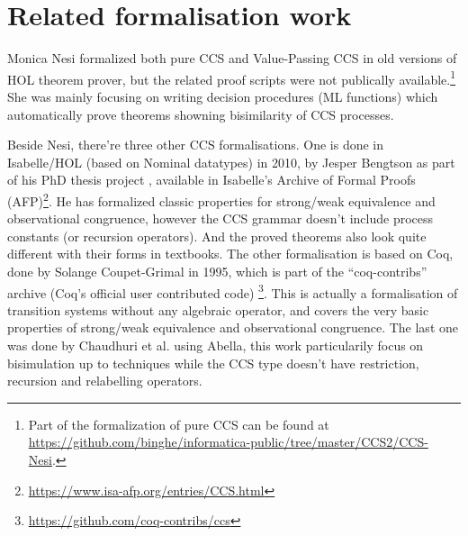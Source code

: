 \section{Related formalisation work}

Monica Nesi formalized both pure CCS \cite{Nesi:1992ve} and Value-Passing CCS
\cite{Nesi:2017wo} in old versions of HOL theorem prover, but the
related proof scripts were not publically available.\footnote{Part of
 the formalization of pure CCS can be found at \url{https://github.com/binghe/informatica-public/tree/master/CCS2/CCS-Nesi}.}
She was mainly focusing on writing decision procedures (ML functions) which
automatically prove theorems showning bisimilarity of CCS
processes.%

Beside Nesi, there're three other CCS formalisations. One
is done in Isabelle/HOL (based on Nominal datatypes) in 2010, by Jesper Bengtson as part of his PhD
thesis project \cite{bengtson2010formalising}, available in Isabelle's Archive of Formal
Proofs (AFP)\footnote{\url{https://www.isa-afp.org/entries/CCS.html}}. He has formalized
classic properties for strong/weak equivalence and observational
congruence, however the CCS grammar doesn't include process constants
(or recursion operators). And the proved theorems also look quite
different with their forms in textbooks.
The other formalisation is based on Coq, done by Solange
Coupet-Grimal in 1995, which is part of the
``coq-contribs'' archive (Coq's official user contributed code)
\footnote{\url{https://github.com/coq-contribs/ccs}}. This is actually
a formalisation of transition systems without any algebraic operator,
and covers the very basic properties of strong/weak equivalence and observational
congruence. The last one was done by Chaudhuri et
al.\cite{chaudhuri2014formalization} using Abella, this work
particularily focus on bisimulation up to techniques while the CCS
type doesn't have restriction, recursion and relabelling operators.
